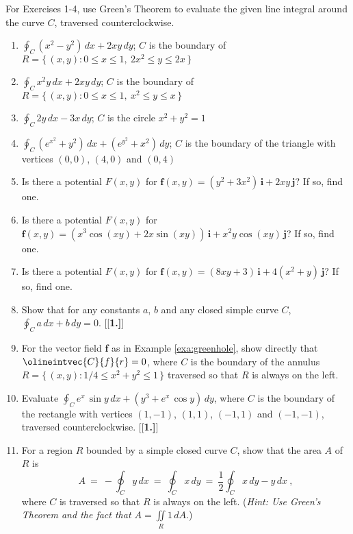\section*{}\begin{multicols}{2}\columnseprule 1pt \columnsep 25pt
\par\noindent For Exercises 1-4, use Green's Theorem to evaluate the given line integral around the curve $C$, traversed
counterclockwise.
\begin{enumerate}[\bfseries 1.]
 \item $\displaystyle\oint_C (x^2 - y^2 )\,dx + 2xy\,dy$; $C$ is the boundary
  of $R = \lbrace\,(x,y): 0 \le x \le 1,~2x^2 \le y \le 2x \,\rbrace$
 \item $\displaystyle\oint_C x^2 y\,dx + 2xy\,dy$; $C$ is the boundary
  of $R = \lbrace\,(x,y): 0 \le x \le 1,~x^2 \le y \le x \,\rbrace$
 \item $\displaystyle\oint_C 2y\,dx - 3x\,dy$; $C$ is the circle $x^2 + y^2 = 1$
 \item $\displaystyle\oint_C (e^{x^2} + y^2 )\,dx + (e^{y^2} + x^2 )\,dy$; $C$ is the boundary of the triangle with
  vertices $(0,0)$, $(4,0)$ and $(0,4)$
 \item Is there a potential $F(x,y)$ for $\textbf{f}(x,y) = (y^2 + 3x^2 )\,\textbf{i} + 2xy\,\textbf{j}$?
  If so, find one.
 \item Is there a potential $F(x,y)$ for $\textbf{f}(x,y) = (x^3 \cos (xy) + 2x \sin (xy))\,\textbf{i} +
  x^2 y \cos (xy)\,\textbf{j}$? If so, find one.
 \item Is there a potential $F(x,y)$ for $\textbf{f}(x,y) = (8xy+3)\,\textbf{i} +
  4(x^2 + y)\,\textbf{j}$? If so, find one.
 \item Show that for any constants $a$, $b$ and any closed simple curve $C$, $\displaystyle\oint_C a\,dx + b\,dy = 0$.
[{[\bfseries 1.]}]
 \item For the vector field \textbf{f} as in Example \ref{exa:greenhole}, show directly that
 $\olineintvec{C}{f}{r} = 0$, where
 $C$ is the boundary of the annulus $R =\lbrace\,(x,y): 1/4 \le x^2 + y^2 \le 1\,\rbrace$ traversed so that $R$ is
 always on the left.
 \item Evaluate $\displaystyle\oint_C  e^x \,\sin y\,dx + (y^3 + e^x \,\cos y)\,dy$, where $C$ is the boundary of the
  rectangle with vertices $(1,-1)$, $(1,1)$, $(-1,1)$ and $(-1,-1)$, traversed counterclockwise.
[{[\bfseries 1.]}]
 \item For a region $R$ bounded by a simple closed curve $C$, show that the area $A$ of $R$ is
  \begin{displaymath}
   A ~=~ -\oint_C y\,dx ~=~ \oint_C x\,dy ~=~ \frac{1}{2}\oint_C x\,dy - y\,dx ~,
  \end{displaymath}
  where $C$ is traversed so that $R$ is always on the left.
  (\emph{Hint: Use Green's Theorem and the fact that $A = \iint\limits_{R} 1\,dA$}.)
\end{enumerate}
   \end{multicols}
